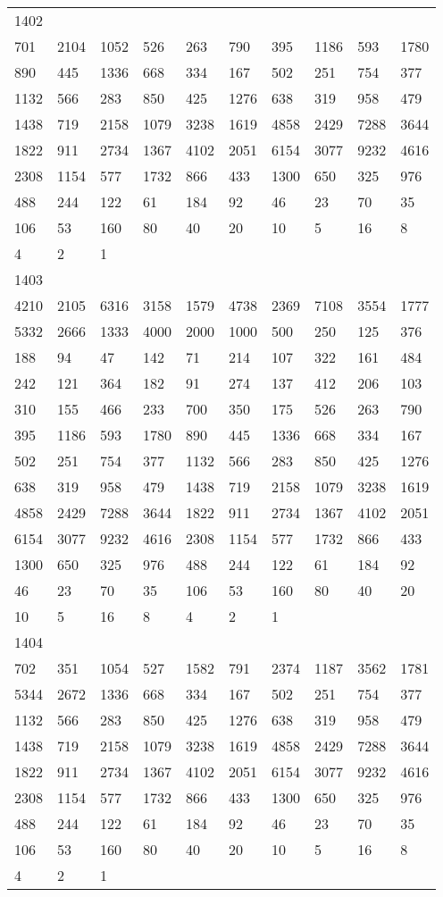 \begin{longtable}{*{10}{l}}
1402&&&&&&&&&\\
701& 2104& 1052& 526& 263& 790& 395& 1186& 593& 1780\\
890& 445& 1336& 668& 334& 167& 502& 251& 754& 377\\
1132& 566& 283& 850& 425& 1276& 638& 319& 958& 479\\
1438& 719& 2158& 1079& 3238& 1619& 4858& 2429& 7288& 3644\\
1822& 911& 2734& 1367& 4102& 2051& 6154& 3077& 9232& 4616\\
2308& 1154& 577& 1732& 866& 433& 1300& 650& 325& 976\\
488& 244& 122& 61& 184& 92& 46& 23& 70& 35\\
106& 53& 160& 80& 40& 20& 10& 5& 16& 8\\
4& 2& 1& \\

1403&&&&&&&&&\\
4210& 2105& 6316& 3158& 1579& 4738& 2369& 7108& 3554& 1777\\
5332& 2666& 1333& 4000& 2000& 1000& 500& 250& 125& 376\\
188& 94& 47& 142& 71& 214& 107& 322& 161& 484\\
242& 121& 364& 182& 91& 274& 137& 412& 206& 103\\
310& 155& 466& 233& 700& 350& 175& 526& 263& 790\\
395& 1186& 593& 1780& 890& 445& 1336& 668& 334& 167\\
502& 251& 754& 377& 1132& 566& 283& 850& 425& 1276\\
638& 319& 958& 479& 1438& 719& 2158& 1079& 3238& 1619\\
4858& 2429& 7288& 3644& 1822& 911& 2734& 1367& 4102& 2051\\
6154& 3077& 9232& 4616& 2308& 1154& 577& 1732& 866& 433\\
1300& 650& 325& 976& 488& 244& 122& 61& 184& 92\\
46& 23& 70& 35& 106& 53& 160& 80& 40& 20\\
10& 5& 16& 8& 4& 2& 1& \\

1404&&&&&&&&&\\
702& 351& 1054& 527& 1582& 791& 2374& 1187& 3562& 1781\\
5344& 2672& 1336& 668& 334& 167& 502& 251& 754& 377\\
1132& 566& 283& 850& 425& 1276& 638& 319& 958& 479\\
1438& 719& 2158& 1079& 3238& 1619& 4858& 2429& 7288& 3644\\
1822& 911& 2734& 1367& 4102& 2051& 6154& 3077& 9232& 4616\\
2308& 1154& 577& 1732& 866& 433& 1300& 650& 325& 976\\
488& 244& 122& 61& 184& 92& 46& 23& 70& 35\\
106& 53& 160& 80& 40& 20& 10& 5& 16& 8\\
4& 2& 1& \\


\end{longtable}
